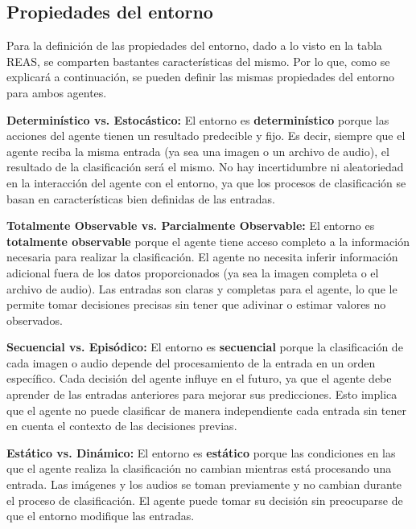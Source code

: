 \documentclass[12pt,a4paper]{article}
\begin{document}
\subsection{Propiedades del entorno}
Para la definición de las propiedades del entorno, dado a lo visto en la tabla REAS, se comparten bastantes características del mismo. Por lo que, como se explicará a continuación, se pueden definir las mismas propiedades del entorno para ambos agentes.

\vspace{10pt}

\textbf{Determinístico vs. Estocástico:}  
El entorno es \textbf{determinístico} porque las acciones del agente tienen un resultado predecible y fijo. Es decir, siempre que el agente reciba la misma entrada (ya sea una imagen o un archivo de audio), el resultado de la clasificación será el mismo. No hay incertidumbre ni aleatoriedad en la interacción del agente con el entorno, ya que los procesos de clasificación se basan en características bien definidas de las entradas.

\vspace{10pt}

\textbf{Totalmente Observable vs. Parcialmente Observable:}  
El entorno es \textbf{totalmente observable} porque el agente tiene acceso completo a la información necesaria para realizar la clasificación. El agente no necesita inferir información adicional fuera de los datos proporcionados (ya sea la imagen completa o el archivo de audio). Las entradas son claras y completas para el agente, lo que le permite tomar decisiones precisas sin tener que adivinar o estimar valores no observados.

\vspace{10pt}

\textbf{Secuencial vs. Episódico:}  
El entorno es \textbf{secuencial} porque la clasificación de cada imagen o audio depende del procesamiento de la entrada en un orden específico. Cada decisión del agente influye en el futuro, ya que el agente debe aprender de las entradas anteriores para mejorar sus predicciones. Esto implica que el agente no puede clasificar de manera independiente cada entrada sin tener en cuenta el contexto de las decisiones previas.

\vspace{10pt}

\textbf{Estático vs. Dinámico:}  
El entorno es \textbf{estático} porque las condiciones en las que el agente realiza la clasificación no cambian mientras está procesando una entrada. Las imágenes y los audios se toman previamente y no cambian durante el proceso de clasificación. El agente puede tomar su decisión sin preocuparse de que el entorno modifique las entradas.
\end{document}
